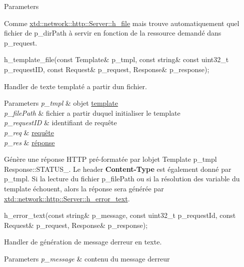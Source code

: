 \begin{DoxyItemize}
\begin{DoxyParams}{Parameters}
\hline
\end{DoxyParams}
Comme \hyperlink{classxtd_1_1network_1_1http_1_1Server_ab3525557fb71fe7ffec9bf68b61db107}{xtd\+::network\+::http\+::\+Server\+::h\+\_\+file} mais trouve automatiquement quel fichier de p\+\_\+dir\+Path à servir en fonction de la ressource demandé dans p\+\_\+request.
\item 
\begin{DoxyCode}
h\_template\_file(\textcolor{keyword}{const} Template& p\_tmpl, \textcolor{keyword}{const} \textcolor{keywordtype}{string}& \textcolor{keyword}{const} uint32\_t p\_requestID, \textcolor{keyword}{const} Request& p\_request,
       Response& p\_response); 
\end{DoxyCode}
 Handler de texte templaté a partir d\textquotesingle{}un fichier. 
\begin{DoxyParams}{Parameters}
{\em p\+\_\+tmpl} & objet \hyperlink{classxtd_1_1network_1_1http_1_1Template}{template} \\
\hline
{\em p\+\_\+file\+Path} & fichier a partir duquel initialiser le template \\
\hline
{\em p\+\_\+request\+ID} & identifiant de requête \\
\hline
{\em p\+\_\+req} & \hyperlink{classxtd_1_1network_1_1http_1_1Request}{requête} \\
\hline
{\em p\+\_\+res} & \hyperlink{classxtd_1_1network_1_1http_1_1Response}{réponse}\\
\hline
\end{DoxyParams}
Génère une réponse H\+T\+TP pré-\/formatée par l\textquotesingle{}objet Template p\+\_\+tmpl Response\+::\+S\+T\+A\+T\+U\+S\+\_. Le header {\bfseries Content-\/\+Type} est également donné par p\+\_\+tmpl. Si la lecture du fichier p\+\_\+file\+Path ou si la résolution des variable du template échouent, alors la réponse sera générée par \hyperlink{classxtd_1_1network_1_1http_1_1Server_ad57a524ff44201af997e2d3557557623}{xtd\+::network\+::http\+::\+Server\+::h\+\_\+error\+\_\+text}.
\item 
\begin{DoxyCode}
h\_error\_text(\textcolor{keyword}{const} \textcolor{keywordtype}{string}& p\_message, \textcolor{keyword}{const} uint32\_t p\_requestId, \textcolor{keyword}{const} Request& p\_request, Response& 
      p\_response); 
\end{DoxyCode}
 Handler de génération de message d\textquotesingle{}erreur en texte. 
\begin{DoxyParams}{Parameters}
{\em p\+\_\+message} & contenu du message d\textquotesingle{}erreur \\

\end{DoxyParams}
\end{DoxyItemize}
